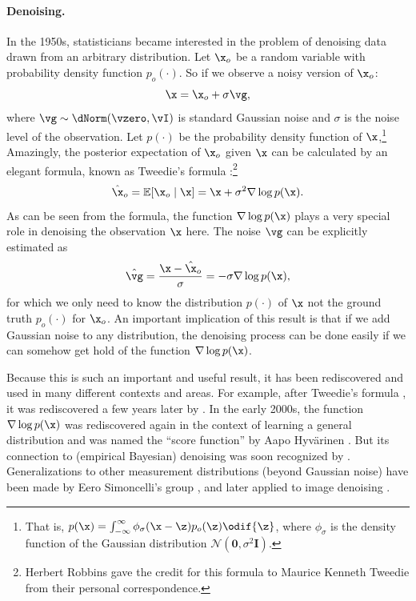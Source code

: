 \documentclass[../../book-main.tex]{subfiles}
\begin{document}
\paragraph{Denoising.} In the 1950s, statisticians became interested in the problem of denoising data drawn from an arbitrary distribution. Let $\x_o$ be a random variable with probability density function $p_o(\cdot)$. So if we observe a noisy version of $\x_o$:
\begin{equation}
    \x = \x_o + \sigma \vg, 
\end{equation}
where $\vg \sim \dNorm(\vzero, \vI)$ is standard Gaussian noise and $\sigma$ is the noise level of the observation. Let $p(\cdot)$ be the probability density function of $\x$,\footnote{That is, $p(\x) = \int_{-\infty}^{\infty} \phi_{\sigma}(\x - \z)p_o(\z) \odif{\z}$, where $\phi_{\sigma}$ is the density function of the Gaussian distribution $\mathcal{N}(\boldsymbol{0}, \sigma^2 \boldsymbol{I})$.} Amazingly, the posterior expectation of $\x_o$ given $\x$ can be calculated by an elegant formula, known as Tweedie's formula \cite{Robbins1956AnEB}:\footnote{Herbert Robbins gave the credit for this formula to Maurice Kenneth Tweedie from their personal correspondence.}
\begin{equation}
    \hat \x_o = \mathbb{E}[\x_o\mid \x] = \x + \sigma^2 \nabla \log p(\x).
\end{equation}
As can be seen from the formula, the function $\nabla \log p(\x)$ plays a very special role in denoising the observation $\x$ here. The noise $\vg$ can be explicitly estimated as
\begin{equation}
    \hat{\vg} = \frac{\x - \hat \x_o}{\sigma} = -\sigma \nabla \log p(\x),
\end{equation}
for which we only need to know the distribution $p(\cdot)$ of $\x$ not the ground truth $p_o(\cdot)$ for $\x_o$. An important implication of this result is that if we add Gaussian noise to any distribution, the denoising process can be done easily if we can somehow get hold of the function $\nabla \log p(\x)$.

Because this is such an important and useful result, it has been rediscovered and used in many different contexts and areas. For example, after Tweedie's formula \cite{Robbins1956AnEB}, it was rediscovered a few years later by \cite{Miyasawa61}. In the early 2000s, the function $\nabla \log p(\x)$ was rediscovered again in the context of learning a general distribution and was named the ``score function'' by Aapo Hyv\"{a}rinen \cite{hyvarinen05a}. But its connection to (empirical Bayesian) denoising was soon recognized by \cite{Vincent2011}.
Generalizations to other measurement distributions (beyond Gaussian noise) have been made by Eero Simoncelli's group \cite{Raphan10}, and later applied to image denoising \cite{Kadkhodaie21a,ho2020denoising}.
\end{document}
